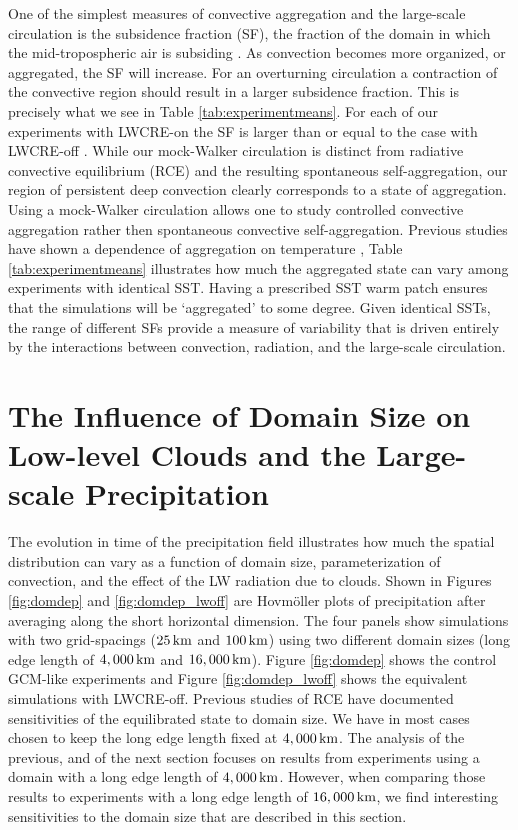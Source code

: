 \documentclass[draft]{agujournal2019}
\begin{document}
One of the simplest measures of convective aggregation and the large-scale circulation is the subsidence fraction (SF), the fraction of the domain 
in which the mid-tropospheric air is subsiding \cite{Coppin_Bony_2015}.  
As convection becomes more organized, or aggregated, the SF will increase.  For an overturning circulation a contraction of the convective 
region should result in a larger subsidence fraction.  
This is precisely what we see in Table \ref{tab:experimentmeans}.  For each of our experiments with LWCRE-on the SF is larger than 
or equal to the case with LWCRE-off .   
While our mock-Walker circulation is distinct from radiative convective equilibrium (RCE) and the resulting spontaneous self-aggregation, our 
region of persistent deep convection clearly corresponds to a state of aggregation. 
Using a mock-Walker circulation allows one to study controlled convective aggregation rather then spontaneous convective self-aggregation. 
Previous studies have shown a dependence of aggregation 
on temperature \cite{Khairoutdinov2010, Wing2014, Cronin2017}, Table \ref{tab:experimentmeans} illustrates how much the aggregated 
state can vary among experiments with identical SST.  Having a prescribed SST warm 
patch ensures that the simulations will be `aggregated' to some degree.  
Given identical SSTs, the  range of different SFs provide a measure of variability that is driven entirely by the interactions between 
convection, radiation, and the large-scale circulation. 


\section{The Influence of Domain Size on Low-level Clouds and the Large-scale Precipitation}


The evolution in time of the precipitation field illustrates how much the spatial distribution can vary as a 
function of domain size, parameterization of convection, and the effect of the LW radiation due to clouds. 
Shown in Figures {\ref{fig:domdep}} and {\ref{fig:domdep_lwoff}} are Hovm{\"o}ller plots of precipitation after 
averaging along the short horizontal dimension.  The four panels show simulations with two grid-spacings 
($25\, \rm{km}$ and $100\, \rm{km}$) using two different domain sizes (long edge length of $4,000\, \rm{km}$ and $16,000\, \rm{km}$).
Figure {\ref{fig:domdep}} shows the control GCM-like experiments and Figure  {\ref{fig:domdep_lwoff}} shows the equivalent simulations with LWCRE-off.    
 Previous studies of RCE
\cite{Bretherton_etal_2005, Bretherton_etal_2006, Muller2012, Jeevanjee2013, Silvers_etal_2016, Dixit_etal_2018, Patrizio_Randall_2019}
have documented sensitivities of the equilibrated state to domain size.  
We have in most cases chosen to keep the long edge length fixed at $4,000\, \rm{km}$. 
The analysis of the previous, and of the next section focuses on results from 
experiments using a domain with a long edge length of $4,000 \, \rm{km}$.  However, when comparing those results
to experiments with a long edge length of $16,000 \, \rm{km}$, we find interesting sensitivities to the domain size that are described in this section. 
\end{document}
